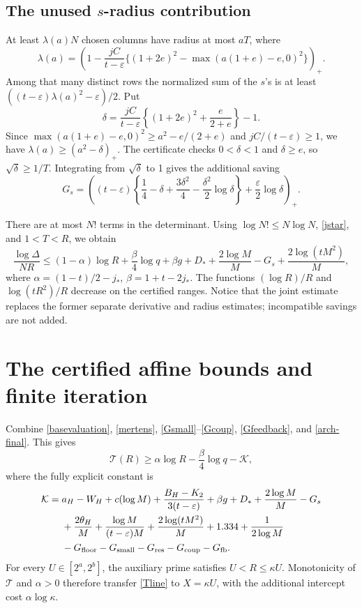 \documentclass[11pt]{article}
\newcommand{\Tn}{\mathcal T}
\begin{document}
\subsection{The unused \texorpdfstring{\(s\)}{s}-radius contribution}
At least \(\lambda(a)N\) chosen columns have radius at most \(aT\), where
\[
 \lambda(a)=\left(1-\frac{jC}{t-\varepsilon}
   \{(1+2e)^2-\max(a(1+e)-e,0)^2\}\right)_+.
\]
Among that many distinct rows the normalized sum of the \(s\)'s is
at least \(((t-\varepsilon)\lambda(a)^2-\varepsilon)/2\).
Put
\[
 \delta=\frac{jC}{t-\varepsilon}
       \left\{(1+2e)^2+\frac e{2+e}\right\}-1.
\]
Since \(\max(a(1+e)-e,0)^2\ge a^2-e/(2+e)\) and
\(jC/(t-\varepsilon)\ge1\), we have
\(\lambda(a)\ge(a^2-\delta)_+\).
The certificate checks \(0<\delta<1\) and \(\delta\ge e\), so
\(\sqrt\delta\ge1/T\). Integrating from \(\sqrt\delta\) to 1 gives
the additional saving
\begin{equation}\label{Gs}
 G_s=\left((t-\varepsilon)
       \left\{\frac14-\delta+\frac{3\delta^2}4
                    -\frac{\delta^2}2\log\delta\right\}
                     +\frac\varepsilon2\log\delta\right)_+.
\end{equation}

There are at most \(N!\) terms in the determinant. Using
\(\log N!\le N\log N\), \eqref{jstar}, and \(1<T<R\), we obtain
\begin{equation}\label{arch-final}
 \frac{\log\Delta}{NR}\le
 (1-\alpha)\log R+\frac\beta4\log q+\beta g
       +D_*+\frac{2\log M}{M}-G_s+\frac{2\log(tM^2)}M,
\end{equation}
where
\(\alpha=(1-t)/2-j_*\), \(\beta=1+t-2j_*\).
The functions \((\log R)/R\) and \(\log(tR^2)/R\) decrease on the
certified ranges. Notice that the joint estimate replaces the former
separate derivative and radius estimates; incompatible savings are
not added.

\section{The certified affine bounds and finite iteration}\label{affine}
Combine \eqref{basevaluation}, \eqref{mertens},
\eqref{Gsmall}--\eqref{Gcoup}, \eqref{Gfeedback}, and
\eqref{arch-final}. This gives
\begin{equation}\label{Tline}
 \Tn(R)\ge\alpha\log R-\frac\beta4\log q-\mathcal K,
\end{equation}
where the fully explicit constant is
\begin{align*}
 \mathcal K={}&a_H-W_H+c(\log M)
 +\frac{B_H-K_2}{3(t-\varepsilon)}+\beta g+D_*
 +\frac{2\log M}{M}-G_s\\
 &+\frac{2\theta_H}{M}+\frac{\log M}{(t-\varepsilon)M}
 +\frac{2\log(tM^2)}M+1.334+\frac1{2\log M}\\
 &-G_{\rm floor}-G_{\rm small}-G_{\rm res}-G_{\rm coup}-G_{\rm fb}.
\end{align*}
For every \(U\in[2^a,2^b]\), the auxiliary prime satisfies
\(U<R\le\kappa U\). Monotonicity of \(\Tn\) and \(\alpha>0\)
therefore transfer \eqref{Tline} to \(X=\kappa U\), with the
additional intercept cost \(\alpha\log\kappa\).
\end{document}
